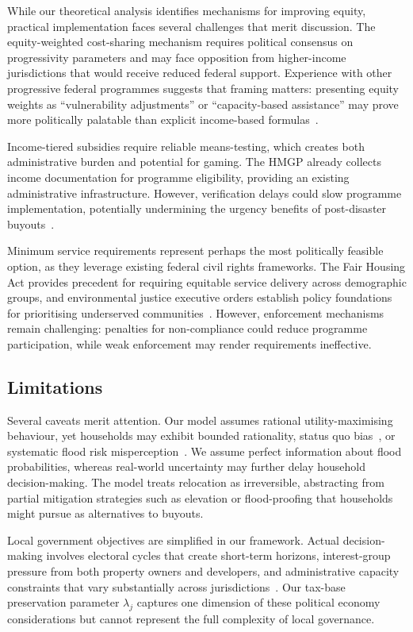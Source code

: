 \documentclass[11pt,letterpaper]{article}
\theoremstyle{definition}
\begin{document}
While our theoretical analysis identifies mechanisms for improving equity, practical implementation faces several challenges that merit discussion. The equity-weighted cost-sharing mechanism requires political consensus on progressivity parameters and may face opposition from higher-income jurisdictions that would receive reduced federal support. Experience with other progressive federal programmes suggests that framing matters: presenting equity weights as ``vulnerability adjustments'' or ``capacity-based assistance'' may prove more politically palatable than explicit income-based formulas~\cite{banzhaf2019environmental}.

Income-tiered subsidies require reliable means-testing, which creates both administrative burden and potential for gaming. The HMGP already collects income documentation for programme eligibility, providing an existing administrative infrastructure. However, verification delays could slow programme implementation, potentially undermining the urgency benefits of post-disaster buyouts~\cite{binder2015framework}.

Minimum service requirements represent perhaps the most politically feasible option, as they leverage existing federal civil rights frameworks. The Fair Housing Act provides precedent for requiring equitable service delivery across demographic groups, and environmental justice executive orders establish policy foundations for prioritising underserved communities~\cite{bullard2007toxic}. However, enforcement mechanisms remain challenging: penalties for non-compliance could reduce programme participation, while weak enforcement may render requirements ineffective.

\subsection{Limitations}

Several caveats merit attention. Our model assumes rational utility-maximising behaviour, yet households may exhibit bounded rationality, status quo bias~\cite{samuelson1988status}, or systematic flood risk misperception~\cite{meyer2017ostrich}. We assume perfect information about flood probabilities, whereas real-world uncertainty may further delay household decision-making. The model treats relocation as irreversible, abstracting from partial mitigation strategies such as elevation or flood-proofing that households might pursue as alternatives to buyouts.

Local government objectives are simplified in our framework. Actual decision-making involves electoral cycles that create short-term horizons, interest-group pressure from both property owners and developers, and administrative capacity constraints that vary substantially across jurisdictions~\cite{greer2021political}. Our tax-base preservation parameter $\lambda_j$ captures one dimension of these political economy considerations but cannot represent the full complexity of local governance.
\end{document}
